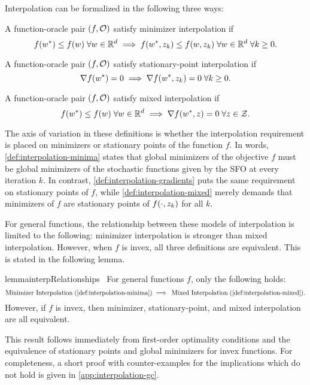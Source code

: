 Interpolation can be formalized in the following three ways:
\begin{definition}\label{def:interpolation-minima}
    A function-oracle pair \( (f, \oracle{}) \) satisfy minimizer interpolation if
    \[ f(\wopt) \leq f(\w) \; \forall \w \in \R^d \implies f(\wopt, \zk) \leq f(\w, \zk) \; \forall \w \in \R^d \; \forall k \geq 0. \]
\end{definition}
\begin{definition}\label{def:interpolation-gradients}
    A function-oracle pair \( (f, \oracle{}) \) satisfy stationary-point interpolation if
    \[ \grad(\wopt) = 0 \implies \grad(\wopt, \zk) = 0 \; \forall k \geq 0. \]
\end{definition}
\begin{definition}\label{def:interpolation-mixed}
    A function-oracle pair \( (f, \oracle{}) \) satisfy mixed interpolation if
    \[ f(\wopt) \leq f(\w) \; \forall \w \in \R^d \implies \grad(\wopt, \z) = 0  \; \forall \z \in \calZ. \]
\end{definition}
The axis of variation in these definitions is whether the interpolation requirement is placed on minimizers or stationary points of the function \( f \).
In words, \autoref{def:interpolation-minima} states that global minimizers of the objective \( f \) must be global minimizers of the stochastic functions given by the SFO at every iteration \( k \).
In contrast, \autoref{def:interpolation-gradients} puts the same requirement on stationary points of \( f \), while \autoref{def:interpolation-mixed} merely demands that minimizers of \( f \) are stationary points of \( f(\cdot, \zk) \) for all \( k \).

For general functions, the relationship between these models of interpolation is limited to the following: minimizer interpolation is stronger than mixed interpolation. 
However, when \( f \) is invex, all three definitions are equivalent.
This is stated in the following lemma.
\begin{restatable}{lemma}{interpRelationships}~\label{thm:interp-relationships}
    For general functions \( f \), only the following holds:
    \[ \text{Minimizer Interpolation} \; (\autoref{def:interpolation-minima}) \implies \; \text{Mixed Interpolation} \; (\autoref{def:interpolation-mixed}). \]
    However, if \( f \) is invex, then minimizer, stationary-point, and mixed interpolation are all equivalent.
\end{restatable}
This result follows immediately from first-order optimality conditions and the equivalence of stationary points and global minimizers for invex functions.
For completeness, a short proof with counter-examples for the implications which do not hold is given in \autoref{app:interpolation-gc}.

